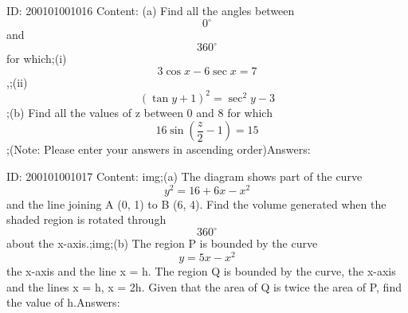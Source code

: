 \documentclass{article}
\begin{document}
ID: 200101001016
Content:
(a) Find all the angles between \[0^{\circ}\] and \[360^{\circ}\]for which;(i) \[3 \cos x -6 \sec x = 7\],;(ii)  \[(\tan y+1)^2=\sec^2y-3\];(b) Find all the values of z between 0 and 8 for which \[16\sin(\frac{z}{2}-1)=15\];(Note: Please enter your answers in ascending order)Answers:

ID: 200101001017
Content:
img;(a) The diagram shows part of the curve \[y^2=16+6x-x^2\] and the line joining A (0, 1) to B (6, 4). Find the volume generated when the shaded region is rotated through \[360^{\circ}\]about the x-axis.;img;(b) The region P is bounded by the curve \[y=5x-x^2\] the x-axis and the line x = h. The region Q is bounded by the curve, the x-axis and the lines x = h, x = 2h. Given that the area of Q is twice the area of P, find the value of h.Answers:
\end{document}

